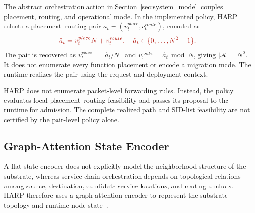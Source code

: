 \documentclass[final,5p]{elsarticle}
\newcommand{\rev}[1]{\textcolor{BrickRed}{#1}}
\begin{document}
The abstract orchestration action in Section~\ref{sec:system_model} couples placement, routing, and operational mode. \rev{In the implemented policy, HARP selects a placement--routing pair \(a_t=(v_t^{place},v_t^{route})\), encoded as}
\begin{equation}
\rev{\hat a_t=v_t^{place}N+v_t^{route},\quad \hat a_t\in\{0,\ldots,N^2-1\}.}
\label{eq:harp_action_encoding}
\end{equation}
\rev{The pair is recovered as \(v_t^{place}=\lfloor\hat a_t/N\rfloor\) and \(v_t^{route}=\hat a_t\bmod N\), giving \(|\mathcal A|=N^2\). It does not enumerate every function placement or encode a migration mode. The runtime realizes the pair using the request and deployment context.}

HARP does not enumerate packet-level forwarding rules. Instead, \rev{the policy evaluates local placement--routing feasibility and passes its proposal to the runtime for admission. The complete realized path and SID-list feasibility are not certified by the pair-level policy alone.}

\subsection{Graph-Attention State Encoder}
\label{subsec:harp_gat}

\rev{A flat state encoder does not explicitly model the neighborhood structure of the substrate}, whereas service-chain orchestration depends on topological relations among source, destination, candidate service locations, and routing anchors. HARP therefore uses a graph-attention encoder to represent the substrate topology and runtime node state~\cite{velickovic2018graph}.
\end{document}
